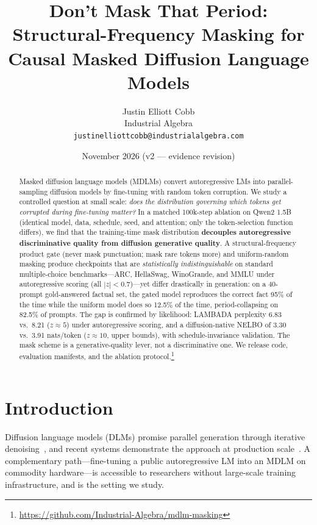 \documentclass{article}
\title{Don't Mask That Period: \\ Structural-Frequency Masking for Causal Masked Diffusion Language Models}
\author{Justin Elliott Cobb\\
Industrial Algebra\\
\texttt{justinelliottcobb@industrialalgebra.com}}
\date{November 2026 (v2 --- evidence revision)}
\begin{document}
\maketitle

\begin{abstract}
Masked diffusion language models (MDLMs) convert autoregressive LMs into
parallel-sampling diffusion models by fine-tuning with random token corruption. We study
a controlled question at small scale: \emph{does the distribution governing which tokens
get corrupted during fine-tuning matter?} In a matched 100k-step ablation on Qwen2 1.5B
(identical model, data, schedule, seed, and attention; only the token-selection function
differs), we find that the training-time mask distribution \textbf{decouples
autoregressive discriminative quality from diffusion generative quality}. A
structural-frequency product gate (never mask punctuation; mask rare tokens more) and
uniform-random masking produce checkpoints that are \emph{statistically
indistinguishable} on standard multiple-choice benchmarks---ARC, HellaSwag, WinoGrande,
and MMLU under autoregressive scoring (all $|z| < 0.7$)---yet differ drastically in
generation: on a 40-prompt gold-answered factual set, the gated model reproduces the
correct fact 95\% of the time while the uniform model does so 12.5\% of the time,
period-collapsing on 82.5\% of prompts. The gap is confirmed by likelihood: LAMBADA
perplexity 6.83 vs.\ 8.21 ($z \approx 5$) under autoregressive scoring, and a
diffusion-native NELBO of 3.30 vs.\ 3.91 nats/token ($z \approx 10$, upper bounds),
with schedule-invariance validation. The mask scheme is a generative-quality lever,
not a discriminative one. We release code, evaluation manifests, and the ablation
protocol.\footnote{\url{https://github.com/Industrial-Algebra/mdlm-masking}}
\end{abstract}

\section{Introduction}

Diffusion language models (DLMs) promise parallel generation through iterative
denoising~\cite{austin2021structured,sahoo2024mdlm}, and recent systems demonstrate the
approach at production scale~\cite{diffusiongemma2026,gevaert2026radiology}. A
complementary path---fine-tuning a public autoregressive LM into an MDLM on commodity
hardware---is accessible to researchers without large-scale training infrastructure,
and is the setting we study.
\end{document}
